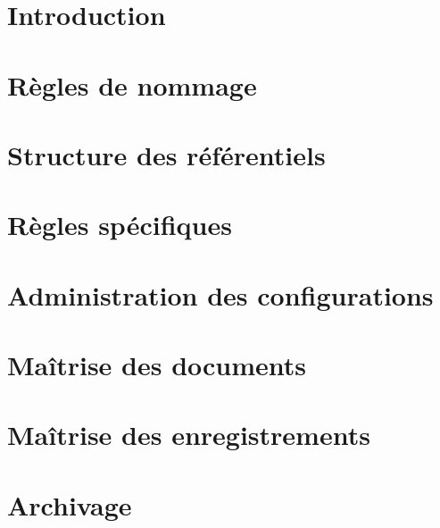 \documentclass[asi]{picInsa}
\begin{document}
 \couverture{}
 \informationsGenerales{}
  
 \tableofcontents
 
 \chapter*{Introduction}
 
 
 \chapter{Règles de nommage}
 \label{chap regle nommage}
 

 \chapter{Structure des référentiels}
 \label{chap struc ref}
  

 \chapter{Règles spécifiques}
 \label{chap regles specifiques}
  

 \chapter{Administration des configurations}
  

 \chapter{Maîtrise des documents}
  

\chapter{Maîtrise des enregistrements}
 

 \chapter{Archivage}
  \label{archivages}
  
\end{document}
